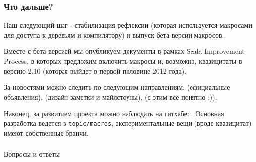 \documentclass[hyperref={bookmarks=false}]{beamer}
\begin{document}
\begin{frame}[t,fragile]
\frametitle{Что дальше?}

Наш следующий шаг - стабилизация рефлексии (которая используется макросами для доступа к деревьям и компилятору) и выпуск бета-версии макросов.

Вместе с бета-версией мы опубликуем документы в рамках Scala Improvement Process, в которых предложим включить макросы и, возможно, квазицитаты в версию 2.10 (которая выйдет в первой половине 2012 года).

За новостями можно следить по следующим направлениям:  (официальные объявления),  (дизайн-заметки и майлстоуны),  (с этим все понятно :)).

Наконец, за развитием проекта можно наблюдать на гитхабе: . Основная разработка ведется в \texttt{topic/macros}, экспериментальные вещи (вроде квазицитат) имеют собственные бранчи.
\end{frame}

\begin{frame}[c, fragile]
\frametitle{}

\centering
{\Large Вопросы и ответы}\\

\centering
{}

\end{frame}
\end{document}
